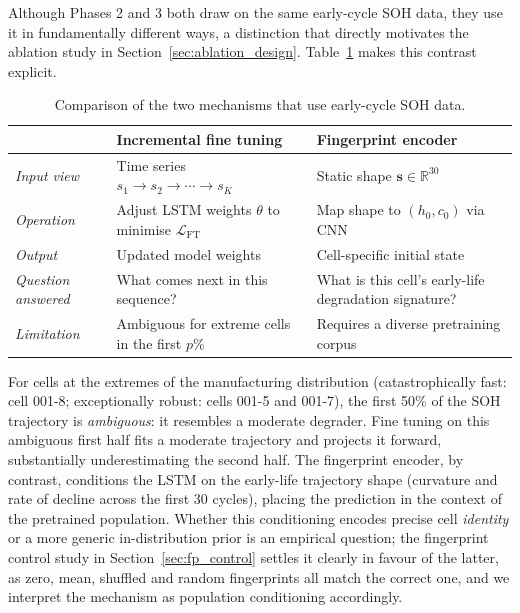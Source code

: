 Although Phases 2 and 3 both draw on the same early-cycle SOH data, they
use it in fundamentally different ways, a distinction that directly motivates
the ablation study in Section~\ref{sec:ablation_design}.
Table~\ref{tab:mechanism_contrast} makes this contrast explicit.

\begin{table}[pos=tbp]
\caption{Comparison of the two mechanisms that use early-cycle SOH data.}
\label{tab:mechanism_contrast}
\centering
\begin{tabularx}{\textwidth}{l X X}
\toprule
 & \textbf{Incremental fine tuning} & \textbf{Fingerprint encoder} \\
\midrule
\textit{Input view} & Time series $s_1 \to s_2 \to \cdots \to s_K$ & Static shape $\mathbf{s} \in \mathbb{R}^{30}$ \\
\textit{Operation}  & Adjust LSTM weights $\theta$ to minimise $\mathcal{L}_{\mathrm{FT}}$ & Map shape to $(h_0, c_0)$ via CNN \\
\textit{Output}     & Updated model weights & Cell-specific initial state \\
\textit{Question answered} & What comes next in this sequence? & What is this cell's early-life degradation signature? \\
\textit{Limitation} & Ambiguous for extreme cells in the first $p$\% & Requires a diverse pretraining corpus \\
\bottomrule
\end{tabularx}
\end{table}

For cells at the extremes of the manufacturing distribution
(catastrophically fast: cell 001-8; exceptionally robust: cells 001-5
and 001-7), the first 50\% of the SOH trajectory is \textit{ambiguous}:
it resembles a moderate degrader.
Fine tuning on this ambiguous first half fits a moderate trajectory and
projects it forward, substantially underestimating the second half.
The fingerprint encoder, by contrast, conditions the LSTM on the early-life
trajectory shape (curvature and rate of decline across the first 30 cycles),
placing the prediction in the context of the pretrained population.
Whether this conditioning encodes precise cell \emph{identity} or a more
generic in-distribution prior is an empirical question; the fingerprint control
study in Section~\ref{sec:fp_control} settles it clearly in favour of the latter,
as zero, mean, shuffled and random fingerprints all match the correct one, and we
interpret the mechanism as population conditioning accordingly.

